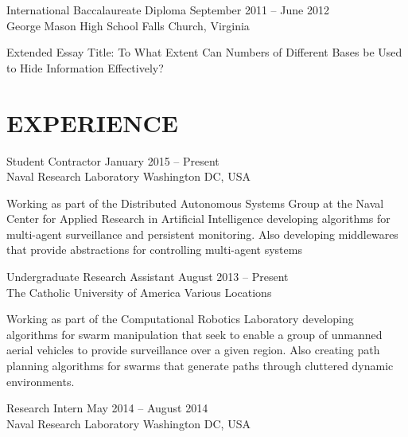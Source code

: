 \documentclass[line,margin]{cv}
\begin{document}
\begin{resume}
International Baccalaureate Diploma
\hfill September 2011 -- June 2012 \\
George Mason High School \hfill Falls Church, Virginia
\begin{adjustwidth}{2.5em}{2.5em}

    Extended Essay Title: To What Extent Can Numbers of Different Bases be Used
    to Hide Information Effectively?

\end{adjustwidth}

\section{EXPERIENCE}

Student Contractor
\hfill January 2015 -- Present \\
Naval Research Laboratory \hfill Washington DC, USA

\begin{adjustwidth}{2.5em}{2.5em}

    Working as part of the Distributed Autonomous Systems Group at the Naval
    Center for Applied Research in Artificial Intelligence developing
    algorithms for multi-agent surveillance and persistent monitoring. Also
    developing middlewares that provide abstractions for controlling
    multi-agent systems

\end{adjustwidth}

Undergraduate Research Assistant
\hfill August 2013 -- Present \\
The Catholic University of America \hfill Various Locations

\begin{adjustwidth}{2.5em}{2.5em}

    Working as part of the Computational Robotics Laboratory developing
    algorithms for swarm manipulation that seek to enable a group of unmanned
    aerial vehicles to provide surveillance over a given region. Also creating
    path planning algorithms for swarms that generate paths through cluttered
    dynamic environments.

\end{adjustwidth}

Research Intern
\hfill May 2014 -- August 2014 \\
Naval Research Laboratory \hfill Washington DC, USA

\begin{adjustwidth}{2.5em}{2.5em}


\end{adjustwidth}
\end{resume}
\end{document}
